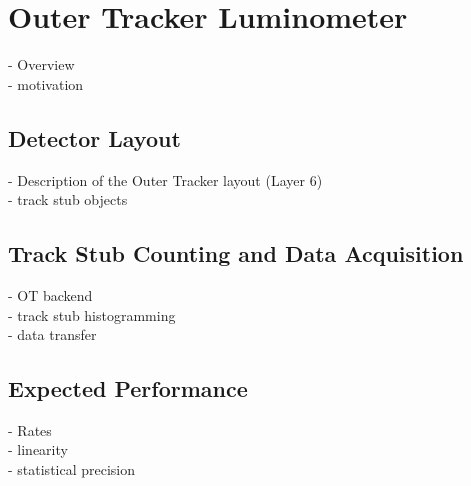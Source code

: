 \chapter{Outer Tracker Luminometer}
- Overview \\
- motivation

\section{Detector Layout }
- Description of the Outer Tracker layout (Layer 6)\\
- track stub objects

\section{Track Stub Counting and Data Acquisition}
- OT backend \\ 
- track stub histogramming \\
- data transfer 

\section{Expected Performance}
- Rates\\
- linearity \\
- statistical precision

\clearpage

